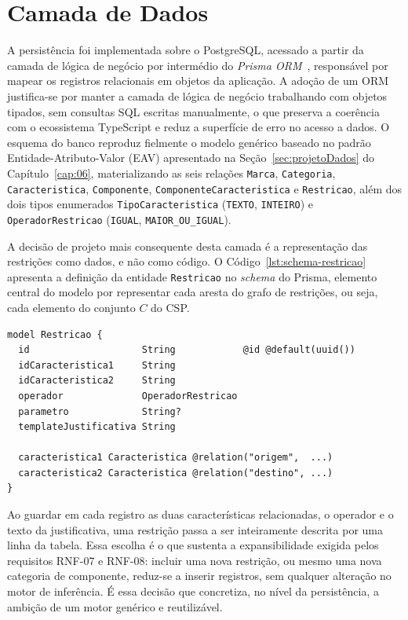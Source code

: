 \section{Camada de Dados}
\label{sec:impl-dados}

A persistência foi implementada sobre o PostgreSQL, acessado a partir da camada de lógica de negócio por intermédio do \textit{Prisma ORM}~\cite{Prisma}, responsável por mapear os registros relacionais em objetos da aplicação. A adoção de um ORM justifica-se por manter a camada de lógica de negócio trabalhando com objetos tipados, sem consultas SQL escritas manualmente, o que preserva a coerência com o ecossistema TypeScript e reduz a superfície de erro no acesso a dados. O esquema do banco reproduz fielmente o modelo genérico baseado no padrão Entidade-Atributo-Valor (EAV) apresentado na Seção~\ref{sec:projetoDados} do Capítulo~\ref{cap:06}, materializando as seis relações \texttt{Marca}, \texttt{Categoria}, \texttt{Caracteristica}, \texttt{Componente}, \texttt{ComponenteCaracteristica} e \texttt{Restricao}, além dos dois tipos enumerados \texttt{TipoCaracteristica} (\texttt{TEXTO}, \texttt{INTEIRO}) e \texttt{OperadorRestricao} (\texttt{IGUAL}, \texttt{MAIOR\_OU\_IGUAL}).

A decisão de projeto mais consequente desta camada é a representação das restrições como dados, e não como código. O Código~\ref{lst:schema-restricao} apresenta a definição da entidade \texttt{Restricao} no \textit{schema} do Prisma, elemento central do modelo por representar cada aresta do grafo de restrições, ou seja, cada elemento do conjunto $C$ do CSP.

\begin{lstlisting}[caption={Definição da entidade Restricao no schema do Prisma},label={lst:schema-restricao},basicstyle=\ttfamily\small]
model Restricao {
  id                    String            @id @default(uuid())
  idCaracteristica1     String
  idCaracteristica2     String
  operador              OperadorRestricao
  parametro             String?
  templateJustificativa String

  caracteristica1 Caracteristica @relation("origem",  ...)
  caracteristica2 Caracteristica @relation("destino", ...)
}
\end{lstlisting}

Ao guardar em cada registro as duas características relacionadas, o operador e o texto da justificativa, uma restrição passa a ser inteiramente descrita por uma linha da tabela. Essa escolha é o que sustenta a expansibilidade exigida pelos requisitos RNF-07 e RNF-08: incluir uma nova restrição, ou mesmo uma nova categoria de componente, reduz-se a inserir registros, sem qualquer alteração no motor de inferência. É essa decisão que concretiza, no nível da persistência, a ambição de um motor genérico e reutilizável.

